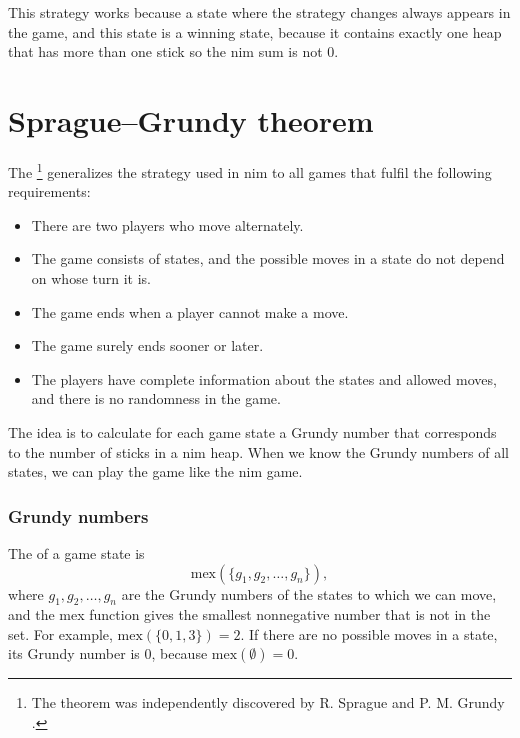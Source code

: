 This strategy works because a state where the
strategy changes always appears in the game,
and this state is a winning state, because
it contains exactly one heap that has more than one stick
so the nim sum is not 0.

\section{Sprague–Grundy theorem}


The \footnote{The theorem was
independently discovered by R. Sprague \cite{spr35} and P. M. Grundy \cite{gru39}.} generalizes the
strategy used in nim to all games that fulfil
the following requirements:

\begin{itemize}[noitemsep]
\item There are two players who move alternately.
\item The game consists of states, and the possible moves
in a state do not depend on whose turn it is.
\item The game ends when a player cannot make a move.
\item The game surely ends sooner or later.
\item The players have complete information about
the states and allowed moves, and there is no randomness in the game.
\end{itemize}
The idea is to calculate for each game state
a Grundy number that corresponds to the number of
sticks in a nim heap.
When we know the Grundy numbers of all states,
we can play the game like the nim game.

\subsubsection{Grundy numbers}


The  of a game state is
\[\textrm{mex}(\{g_1,g_2,\ldots,g_n\}),\]
where $g_1,g_2,\ldots,g_n$ are the Grundy numbers of the
states to which we can move,
and the mex function gives the smallest
nonnegative number that is not in the set.
For example, $\textrm{mex}(\{0,1,3\})=2$.
If there are no possible moves in a state,
its Grundy number is 0, because
$\textrm{mex}(\emptyset)=0$.

